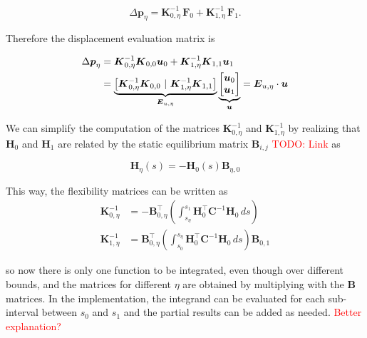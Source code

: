 \begin{equation}
\Delta\boldsymbol{p}_{\eta} = \boldsymbol{K}_{0,\eta}^{-1}\,\boldsymbol{F}_0 + \boldsymbol{K}_{1,\eta}^{-1}\,\boldsymbol{F}_1.
\end{equation}

Therefore the displacement evaluation matrix is

\begin{align}
\Delta\boldsymbol{p}_{\eta} &= \boldsymbol{K}_{0,\eta}^{-1}\boldsymbol{K}_{0,0}\boldsymbol{u}_0 + \boldsymbol{K}_{1,\eta}^{-1}\boldsymbol{K}_{1,1}\boldsymbol{u}_1 \\
&=
\underbrace{
\left[\boldsymbol{K}_{0,\eta}^{-1}\boldsymbol{K}_{0,0} \ \vert\ \boldsymbol{K}_{1,\eta}^{-1}\boldsymbol{K}_{1,1}\right]
}_{\boldsymbol{E}_{u,\eta}}
\underbrace{
\begin{bmatrix}
\boldsymbol{u}_0 \notag \\
\boldsymbol{u}_1
\end{bmatrix}
}_{\boldsymbol{u}} \notag = \boldsymbol{E}_{u,\eta}\cdot\boldsymbol{u}
\end{align}

We can simplify the computation of the matrices $\boldsymbol{K}_{0,\eta}^{-1}$ and $\boldsymbol{K}^{-1}_{1,\eta}$ by realizing that $\boldsymbol{H}_0$ and $\boldsymbol{H}_1$ are related by the static equilibrium matrix $\boldsymbol{B}_{i,j}$ \textcolor{red}{TODO: Link} as

\begin{equation}
\boldsymbol{H}_\eta(s) = -\boldsymbol{H}_0(s)\boldsymbol{B}_{\eta,0}
\end{equation}

This way, the flexibility matrices can be written as
%
\begin{align}
\boldsymbol{K}_{0,\eta}^{-1} &= -\boldsymbol{B}_{0,\eta}^\intercal\left(\int_{s_\eta}^{s_1} \boldsymbol{H}_0^\intercal\boldsymbol{C}^{-1}\boldsymbol{H}_0\,ds\right) \\
\boldsymbol{K}^{-1}_{1,\eta} &= \boldsymbol{B}_{0,\eta}^\intercal\left(\int_{s_0}^{s_\eta} \boldsymbol{H}_0^\intercal\boldsymbol{C}^{-1}\boldsymbol{H}_0\,ds\right)\boldsymbol{B}_{0,1}
\end{align}

so now there is only one function to be integrated, even though over different bounds, and the matrices for different $\eta$ are obtained by multiplying with the $\boldsymbol{B}$ matrices.
In the implementation, the integrand can be evaluated for each sub-interval between $s_0$ and $s_1$ and the partial results can be added as needed. \textcolor{red}{Better explanation?}

